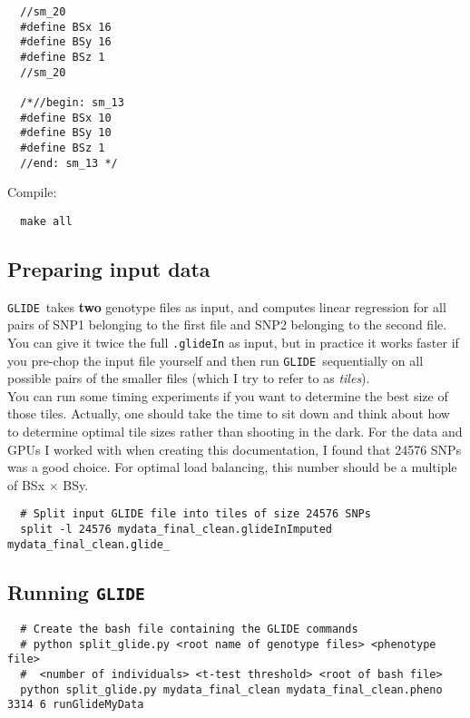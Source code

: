 \documentclass{article}
\newcommand{\glide}{\texttt{GLIDE}}
\begin{document}
\begin{verbatim}
  //sm_20 
  #define BSx 16 
  #define BSy 16 
  #define BSz 1 
  //sm_20 

  /*//begin: sm_13 
  #define BSx 10 
  #define BSy 10 
  #define BSz 1 
  //end: sm_13 */
\end{verbatim}

Compile:\\

\begin{verbatim}
  make all
\end{verbatim}

\subsection{Preparing input data}
\glide\ takes {\bf two} genotype files as input, and computes linear regression for all pairs of SNP1 belonging to the first file and SNP2 belonging to the second file. You can give it twice the full \texttt{.glideIn} as input, but in practice it works faster if you pre-chop the input file yourself and then run \glide\ sequentially on all possible pairs of the smaller files (which I try to refer to as {\em tiles}).\\

You can run some timing experiments if you want to determine the best size of those tiles. Actually, one should take the time to sit down and think about how to determine optimal tile sizes rather than shooting in the dark. For the data and GPUs I worked with when creating this documentation, I found that 24576 SNPs was a good choice. For optimal load balancing, this number should be a multiple of BSx $\times$ BSy. \\

\begin{verbatim}
  # Split input GLIDE file into tiles of size 24576 SNPs
  split -l 24576 mydata_final_clean.glideInImputed mydata_final_clean.glide_
\end{verbatim}

\subsection{Running \glide}

\begin{verbatim}
  # Create the bash file containing the GLIDE commands
  # python split_glide.py <root name of genotype files> <phenotype file> 
  #  <number of individuals> <t-test threshold> <root of bash file>
  python split_glide.py mydata_final_clean mydata_final_clean.pheno 3314 6 runGlideMyData
\end{verbatim}
\end{document}
